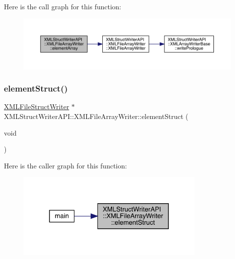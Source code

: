 Here is the call graph for this function\+:
\nopagebreak
\begin{figure}[H]
\begin{center}
\leavevmode
\includegraphics[width=350pt]{d1/d9d/classXMLStructWriterAPI_1_1XMLFileArrayWriter_ad455da07ae5725cffdab8b056681ec2d_cgraph}
\end{center}
\end{figure}
\mbox{\label{classXMLStructWriterAPI_1_1XMLFileArrayWriter_aca9a5098cc4549e2001fc148ccb6329e}} 
\subsubsection{\texorpdfstring{elementStruct()}{elementStruct()}\hspace{0.1cm}{\footnotesize\ttfamily [1/3]}}
{\footnotesize\ttfamily \mbox{\hyperlink{classXMLStructWriterAPI_1_1XMLFileStructWriter}{X\+M\+L\+File\+Struct\+Writer}} $\ast$ X\+M\+L\+Struct\+Writer\+A\+P\+I\+::\+X\+M\+L\+File\+Array\+Writer\+::element\+Struct (\begin{DoxyParamCaption}\item[{void}]{ }\end{DoxyParamCaption})}

Here is the caller graph for this function\+:
\nopagebreak
\begin{figure}[H]
\begin{center}
\leavevmode
\includegraphics[width=262pt]{d1/d9d/classXMLStructWriterAPI_1_1XMLFileArrayWriter_aca9a5098cc4549e2001fc148ccb6329e_icgraph}
\end{center}
\end{figure}
\mbox{\label{classXMLStructWriterAPI_1_1XMLFileArrayWriter_a53910cfce30307c3333d553b7f018e64}} 
